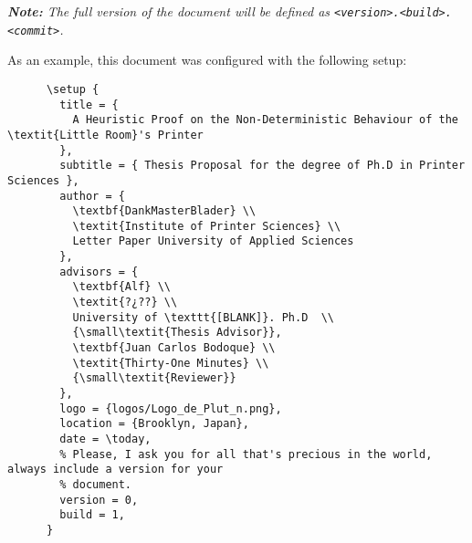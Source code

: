     \textit{\textbf{Note:} The full version of the document will be defined as 
    \texttt{<version>.<build>.<commit>}.}

    As an example, this document was configured with the following setup:
    \begin{verbatim}
      \setup { 
        title = {
          A Heuristic Proof on the Non-Deterministic Behaviour of the \textit{Little Room}'s Printer
        },
        subtitle = { Thesis Proposal for the degree of Ph.D in Printer Sciences },
        author = {
          \textbf{DankMasterBlader} \\
          \textit{Institute of Printer Sciences} \\
          Letter Paper University of Applied Sciences
        },
        advisors = {
          \textbf{Alf} \\
          \textit{?¿??} \\
          University of \texttt{[BLANK]}. Ph.D  \\
          {\small\textit{Thesis Advisor}},
          \textbf{Juan Carlos Bodoque} \\
          \textit{Thirty-One Minutes} \\
          {\small\textit{Reviewer}}
        },
        logo = {logos/Logo_de_Plut_n.png},
        location = {Brooklyn, Japan},
        date = \today,
        % Please, I ask you for all that's precious in the world, always include a version for your 
        % document.
        version = 0,
        build = 1,
      }
    \end{verbatim}